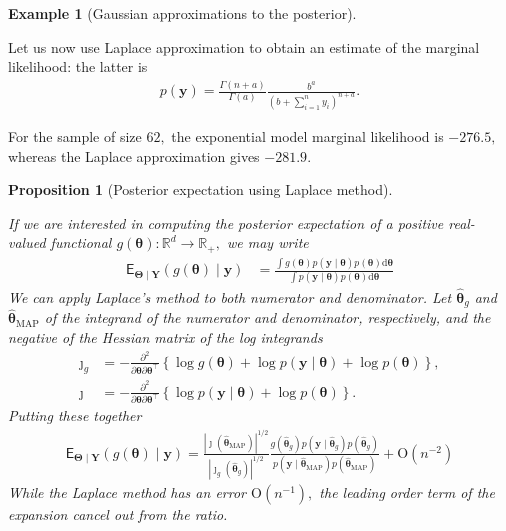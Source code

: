 \documentclass[
  11pt,
  letterpaper,
]{scrbook}
\theoremstyle{definition}
\theoremstyle{definition}
\newtheorem{example}{Example}[chapter]
\theoremstyle{definition}
\theoremstyle{plain}
\newtheorem{proposition}{Proposition}[chapter]
\theoremstyle{plain}
\theoremstyle{plain}
\theoremstyle{remark}
\begin{document}
\begin{example}[Gaussian approximations to the
posterior]
\begin{figure}[ht!]
\end{figure}%

Let us now use Laplace approximation to obtain an estimate of the
marginal likelihood: the latter is \begin{align*}
p(\boldsymbol{y}) = \frac{\Gamma(n+a)}{\Gamma(a)}\frac{b^a}{\left(b + \sum_{i=1}^n y_i \right)^{n+a}}.
\end{align*}

For the sample of size \(62,\) the exponential model marginal likelihood
is \(-276.5,\) whereas the Laplace approximation gives \(-281.9.\)

\end{example}

\begin{proposition}[Posterior expectation using Laplace
method]\protect\hypertarget{prp-expectation-Laplace}{}\label{prp-expectation-Laplace}

If we are interested in computing the posterior expectation of a
positive real-valued functional
\(g(\boldsymbol{\theta}): \mathbb{R}^d \to \mathbb{R}_{+},\) we may
write \begin{align*}
 \mathsf{E}_{\boldsymbol{\Theta} \mid \boldsymbol{Y}}(g(\boldsymbol{\theta}) \mid \boldsymbol{y}) &=  \frac{\int g(\boldsymbol{\theta}) p(\boldsymbol{y} \mid \boldsymbol{\theta}) p( \boldsymbol{\theta}) \mathrm{d} \boldsymbol{\theta}}{\int p(\boldsymbol{y} \mid \boldsymbol{\theta})p( \boldsymbol{\theta}) \mathrm{d} \boldsymbol{\theta}}
\end{align*} We can apply Laplace's method to both numerator and
denominator. Let \(\widehat{\boldsymbol{\theta}}_g\) and
\(\widehat{\boldsymbol{\theta}}_{\mathrm{MAP}}\) of the integrand of the
numerator and denominator, respectively, and the negative of the Hessian
matrix of the log integrands \begin{align*}
\jmath_g&=  -\frac{\partial^2}{\partial \boldsymbol{\theta}\partial \boldsymbol{\theta}^\top} \left\{ \log g(\boldsymbol{\theta}) + \log p(\boldsymbol{y} \mid \boldsymbol{\theta}) + \log p(\boldsymbol{\theta})\right\}, \\
\jmath &=  -\frac{\partial^2}{\partial \boldsymbol{\theta}\partial \boldsymbol{\theta}^\top} \left\{\log p(\boldsymbol{y} \mid \boldsymbol{\theta}) + \log p(\boldsymbol{\theta})\right\}.
\end{align*} Putting these together \begin{align*}
\mathsf{E}_{\boldsymbol{\Theta} \mid \boldsymbol{Y}}(g(\boldsymbol{\theta}) \mid \boldsymbol{y}) = \frac{|\jmath(\widehat{\boldsymbol{\theta}}_{\mathrm{MAP}})|^{1/2}}{|\jmath_g(\widehat{\boldsymbol{\theta}}_g)|^{1/2}} \frac{g(\widehat{\boldsymbol{\theta}}_g) p(\boldsymbol{y} \mid \widehat{\boldsymbol{\theta}}_g) p( \widehat{\boldsymbol{\theta}}_g)}{p(\boldsymbol{y} \mid \widehat{\boldsymbol{\theta}}_{\mathrm{MAP}}) p(\widehat{\boldsymbol{\theta}}_{\mathrm{MAP}})} + \mathrm{O}(n^{-2})
\end{align*} While the Laplace method has an error
\(\mathrm{O}(n^{-1}),\) the leading order term of the expansion cancel
out from the ratio.

\end{proposition}
\end{document}
